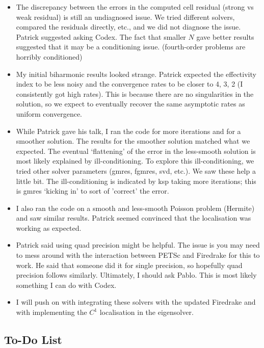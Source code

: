 \documentclass[12pt,a4paper]{article}
\begin{document}
\begin{itemize}
    \item The discrepancy between the errors in the computed cell residual (strong vs weak residual) is still an undiagnosed issue. We tried different solvers, compared the residuals directly, etc., and we did not diagnose the issue. Patrick suggested asking Codex. The fact that smaller $N$ gave better results suggested that it may be a conditioning issue. (fourth-order problems are horribly conditioned)
    \item My initial biharmonic results looked strange. Patrick expected the effectivity index to be less noisy and the convergence rates to be closer to 4, 3, 2 (I consistently got high rates). This is because there are no singularities in the solution, so we expect to eventually recover the same asymptotic rates as uniform convergence. 
    \item While Patrick gave his talk, I ran the code for more iterations and for a smoother solution. The results for the smoother solution matched what we expected. The eventual    `flattening' of the error in the less-smooth solution is most likely explained by ill-conditioning. To explore this ill-conditioning, we tried other solver parameters (gmres, fgmres, svd, etc.). We saw these help a little bit. The ill-conditioning is indicated by ksp taking more iterations; this is gmres `kicking in' to sort of 'correct' the error. 
    \item I also ran the code on a smooth and less-smooth Poisson problem (Hermite) and saw similar results. Patrick seemed convinced that the localisation was working as expected. 
    \item Patrick said using quad precision might be helpful. The issue is you may need to mess around with the interaction between PETSc and Firedrake for this to work. He said that someone did it for single precision, so hopefully quad precision follows similarly. Ultimately, I should ask Pablo. This is most likely something I can do with Codex. 
    \item I will push on with integrating these solvers with the updated Firedrake and with implementing the $C^1$ localisation in the eigensolver. 
\end{itemize}

\subsection{To-Do List}
\end{document}
